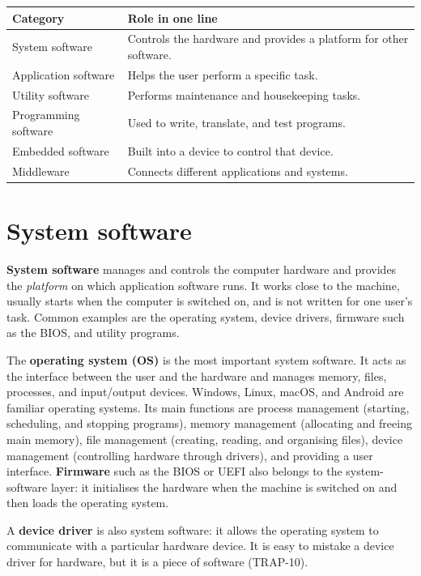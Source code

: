 \begin{center}
\begin{tabular}{p{}p{}}
\toprule
\textbf{Category} & \textbf{Role in one line} \\
\midrule
System software & Controls the hardware and provides a platform for other software. \\
Application software & Helps the user perform a specific task. \\
Utility software & Performs maintenance and housekeeping tasks. \\
Programming software & Used to write, translate, and test programs. \\
Embedded software & Built into a device to control that device. \\
Middleware & Connects different applications and systems. \\
\bottomrule
\end{tabular}
\end{center}

\section{System software}
\textbf{System software} manages and controls the computer hardware and
provides the \emph{platform} on which application software runs. It works
close to the machine, usually starts when the computer is switched on, and is
not written for one user's task. Common examples are the operating system,
device drivers, firmware such as the BIOS, and utility programs.

The \textbf{operating system (OS)} is the most important system software. It
acts as the interface between the user and the hardware and manages memory,
files, processes, and input/output devices. Windows, Linux, macOS, and Android
are familiar operating systems. Its main functions are process management
(starting, scheduling, and stopping programs), memory management (allocating
and freeing main memory), file management (creating, reading, and organising
files), device management (controlling hardware through drivers), and
providing a user interface. \textbf{Firmware} such as the BIOS or UEFI also
belongs to the system-software layer: it initialises the hardware when the
machine is switched on and then loads the operating system.

A \textbf{device driver} is also system
software: it allows the operating system to communicate with a particular
hardware device. It is easy to mistake a device driver for hardware, but it is
a piece of software (TRAP-10).

